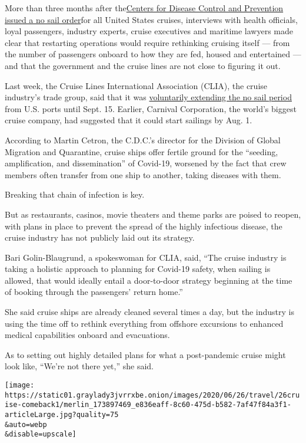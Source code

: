 More than three months after
the\href{https://www.cdc.gov/quarantine/cruise/index.html}{Centers for
Disease Control and Prevention issued a no sail order}for all United
States cruises, interviews with health officials, loyal passengers,
industry experts, cruise executives and maritime lawyers made clear that
restarting operations would require rethinking cruising itself --- from
the number of passengers onboard to how they are fed, housed and
entertained --- and that the government and the cruise lines are not
close to figuring it out.

Last week, the Cruise Lines International Association (CLIA), the cruise
industry's trade group, said that it was
\href{https://cruising.org/news-and-research/press-room/2020/june/clia-announces-voluntary-suspension-of-cruise-operations-from-us-ports}{voluntarily
extending the no sail period} from U.S. ports until Sept. 15. Earlier,
Carnival Corporation, the world's biggest cruise company, had suggested
that it could start sailings by Aug. 1.

According to Martin Cetron, the C.D.C.'s director for the Division of
Global Migration and Quarantine, cruise ships offer fertile ground for
the ``seeding, amplification, and dissemination'' of Covid-19, worsened
by the fact that crew members often transfer from one ship to another,
taking diseases with them.

Breaking that chain of infection is key.

But as restaurants, casinos, movie theaters and theme parks are poised
to reopen, with plans in place to prevent the spread of the highly
infectious disease, the cruise industry has not publicly laid out its
strategy.

Bari Golin-Blaugrund, a spokeswoman for CLIA, said, ``The cruise
industry is taking a holistic approach to planning for Covid-19 safety,
when sailing is allowed, that would ideally entail a door-to-door
strategy beginning at the time of booking through the passengers' return
home.''

She said cruise ships are already cleaned several times a day, but the
industry is using the time off to rethink everything from offshore
excursions to enhanced medical capabilities onboard and evacuations.

As to setting out highly detailed plans for what a post-pandemic cruise
might look like, ``We're not there yet,'' she said.

\texttt{[image: https://static01.graylady3jvrrxbe.onion/images/2020/06/26/travel/26cruise-comeback1/merlin\_173897469\_e836eaff-8c60-475d-b582-7af47f84a3f1-articleLarge.jpg?quality=75\\\&auto=webp\\\&disable=upscale]}


